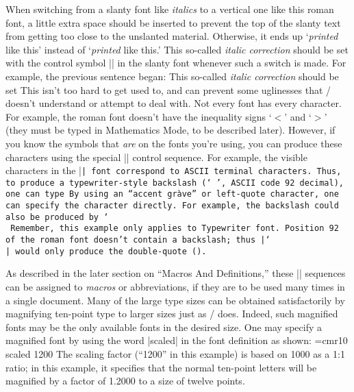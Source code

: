 When switching from a slanty font like {\it italics\/} to a vertical
one like this roman font, a little extra space should be inserted
to prevent the top of the slanty text from getting too close to
the unslanted material.  Otherwise,
it ends up `{\it printed} like this' instead of
`{\it printed\/} like this.'  This so-called {\sl italic
correction\/} should be set with the
control symbol |\/| in the slanty font whenever such a 
switch is made.  For example, the previous sentence began:
\begintt
This so-called {\sl italic correction\/} should be set
\endtt
This isn't too hard to get used to, and can prevent some
uglinesses that \Troff/ doesn't understand or attempt to
deal with.
Not every font has every character.  For example, the
roman font doesn't have the inequality signs `$<$' and
`$>$' (they must be typed in Mathematics Mode, to be
described later).  However, if you know the symbols that
{\sl are\/} on the fonts you're using, you can produce
these characters using the special |\char| control sequence.
For example, the visible characters in the |\tt| font correspond
to ASCII terminal characters.  Thus, to produce a typewriter-style
backslash (`{\tt\\}', ASCII code 92 decimal), one can type
\begintt
{\tt{}}
\endtt
By using an ``accent gr\`ave'' or left-quote character, one
can specify the character directly.  For example, the backslash
could also be produced by
\begintt
{\tt\char`\\}
\endtt
Remember, this example only applies to Typewriter font.  Position
92 of the roman font doesn't contain a backslash; thus
|\char`\\| would only produce the double-quote ().

As described in the  later section on ``Macros And Definitions,''
these |\char| sequences can be assigned to {\sl macros\/} or abbreviations,
if they are to be used many times in a single document.
Many of the large type sizes can be obtained satisfactorily
by magnifying ten-point type to larger sizes just as
\Troff/ does.  Indeed, such magnified fonts may be the only
available fonts in the desired size.  One may specify a
magnified font by using the word |scaled| in the font
definition as shown:
\begintt
\font\twelverm=cmr10 scaled 1200
\endtt
The scaling factor (``1200'' in this example) is based on
1000 as a 1:1 ratio; in this example, it specifies that
the normal ten-point letters will be magnified by a factor
of 1.2000 to a size of twelve points.

